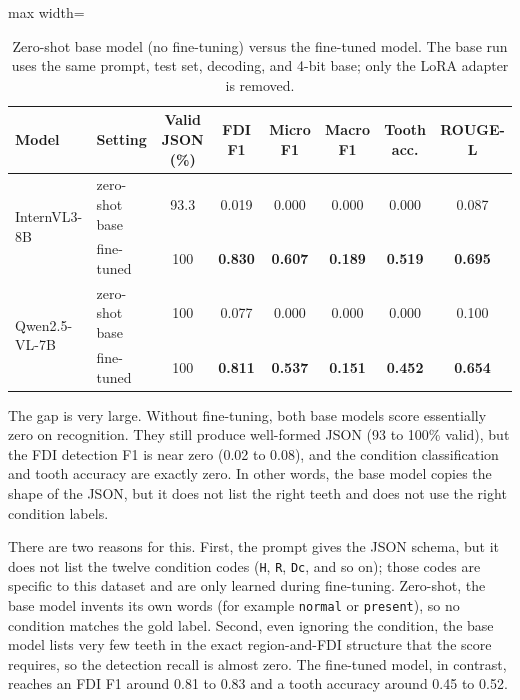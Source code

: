 \documentclass[a4paper,12pt]{report}
\begin{document}
\begin{table}[H]
\centering
\caption{Zero-shot base model (no fine-tuning) versus the fine-tuned model. The base run uses the same prompt, test set, decoding, and 4-bit base; only the LoRA adapter is removed.}
\label{tab:base-vs-ft}
\small
\begin{adjustbox}{max width=\textwidth}
\begin{tabular}{llcccccc}
\toprule
Model & Setting & Valid JSON (\%) & FDI F1 & Micro F1 & Macro F1 & Tooth acc. & ROUGE-L \\
\midrule
\multirow{2}{*}{InternVL3-8B}  & zero-shot base & 93.3 & 0.019 & 0.000 & 0.000 & 0.000 & 0.087 \\
                               & fine-tuned     & 100  & \textbf{0.830} & \textbf{0.607} & \textbf{0.189} & \textbf{0.519} & \textbf{0.695} \\
\midrule
\multirow{2}{*}{Qwen2.5-VL-7B} & zero-shot base & 100  & 0.077 & 0.000 & 0.000 & 0.000 & 0.100 \\
                               & fine-tuned     & 100  & \textbf{0.811} & \textbf{0.537} & \textbf{0.151} & \textbf{0.452} & \textbf{0.654} \\
\bottomrule
\end{tabular}
\end{adjustbox}
\end{table}

The gap is very large. Without fine-tuning, both base models score essentially zero on recognition. They still produce well-formed JSON (93 to 100\% valid), but the FDI detection F1 is near zero (0.02 to 0.08), and the condition classification and tooth accuracy are exactly zero. In other words, the base model copies the shape of the JSON, but it does not list the right teeth and does not use the right condition labels.

There are two reasons for this. First, the prompt gives the JSON schema, but it does not list the twelve condition codes (\texttt{H}, \texttt{R}, \texttt{Dc}, and so on); those codes are specific to this dataset and are only learned during fine-tuning. Zero-shot, the base model invents its own words (for example \texttt{normal} or \texttt{present}), so no condition matches the gold label. Second, even ignoring the condition, the base model lists very few teeth in the exact region-and-FDI structure that the score requires, so the detection recall is almost zero. The fine-tuned model, in contrast, reaches an FDI F1 around 0.81 to 0.83 and a tooth accuracy around 0.45 to 0.52.
\end{document}
